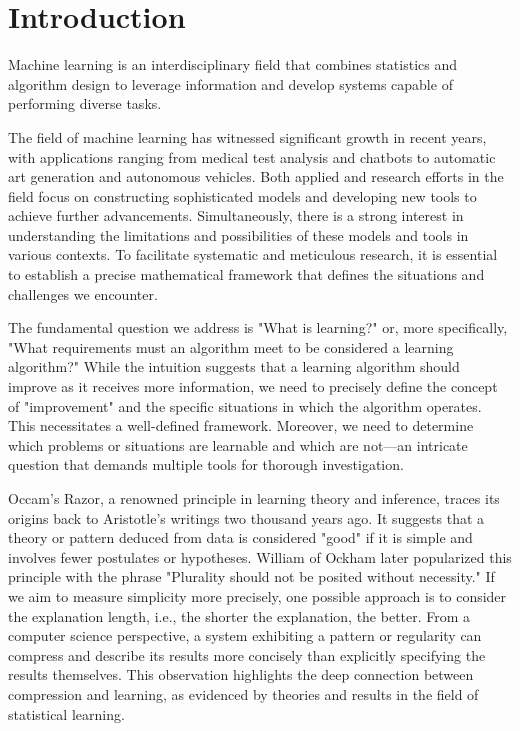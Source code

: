 \chapter{Introduction}

Machine learning is an interdisciplinary field that combines statistics and algorithm design to leverage information and develop systems capable of performing diverse tasks.

The field of machine learning has witnessed significant growth in recent years, with applications ranging from medical test analysis and chatbots to automatic art generation and autonomous vehicles. Both applied and research efforts in the field focus on constructing sophisticated models and developing new tools to achieve further advancements. Simultaneously, there is a strong interest in understanding the limitations and possibilities of these models and tools in various contexts. To facilitate systematic and meticulous research, it is essential to establish a precise mathematical framework that defines the situations and challenges we encounter.

The fundamental question we address is "What is learning?" or, more specifically, "What requirements must an algorithm meet to be considered a learning algorithm?" While the intuition suggests that a learning algorithm should improve as it receives more information, we need to precisely define the concept of "improvement" and the specific situations in which the algorithm operates. This necessitates a well-defined framework. Moreover, we need to determine which problems or situations are learnable and which are not—an intricate question that demands multiple tools for thorough investigation.

Occam's Razor, a renowned principle in learning theory and inference, traces its origins back to Aristotle's writings two thousand years ago. It suggests that a theory or pattern deduced from data is considered "good" if it is simple and involves fewer postulates or hypotheses. William of Ockham later popularized this principle with the phrase "Plurality should not be posited without necessity." If we aim to measure simplicity more precisely, one possible approach is to consider the explanation length, i.e., the shorter the explanation, the better. From a computer science perspective, a system exhibiting a pattern or regularity can compress and describe its results more concisely than explicitly specifying the results themselves. This observation highlights the deep connection between compression and learning, as evidenced by theories and results in the field of statistical learning.

